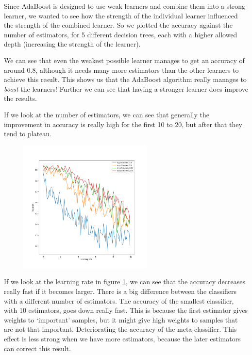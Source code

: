 \documentclass[11pt]{article}
\begin{document}
Since AdaBoost is designed to use weak learners and combine them into a strong learner, we wanted to see how the strength of the individual learner influenced the strength of the combined learner. So we plotted the accuracy against the number of estimators, for 5 different decision trees, each with a higher allowed depth (increasing the strength of the learner). 

We can see that even the weakest possible learner manages to get an accuracy of around 0.8, although it needs many more estimators than the other learners to achieve this result. This shows us that the AdaBoost algorithm really manages to \emph{boost} the learners! Further we can see that having a stronger learner does improve the results.

If we look at the number of estimators, we can see that generally the improvement in accuracy is really high for the first 10 to 20, but after that they tend to plateau.


\begin{figure}[h]
	\centering
	\includegraphics[width=0.6\textwidth]{images/ex2_5_lr_estimators}
	\caption{}
	\label{fig:lr}
\end{figure}



If we look at the learning rate in figure \ref{fig:lr}, we can see that the accuracy decreases really fast if it becomes larger. There is a big difference between the classifiers with a different number of estimators. The accuracy of the smallest classifier, with 10 estimators, goes down really fast. This is because the first estimator gives weights to `important' samples, but it might give high weights to samples that are not that important. Deteriorating the accuracy of the meta-classifier.
This effect is less strong when we have more estimators, because the later estimators can correct this result.
\end{document}
